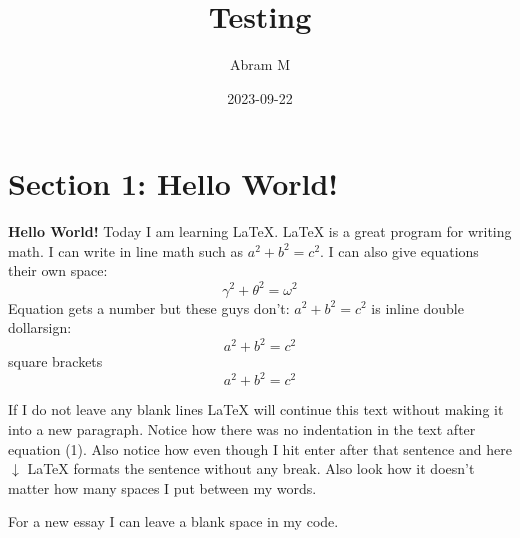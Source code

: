 \documentclass{article} %
\title{Testing} %
\author{Abram M} %
\date{2023-09-22} %
\begin{document}
\maketitle %

\section{Section 1: Hello World!} %

\textbf{Hello World!} Today I am learning \LaTeX. %
\LaTeX{} is a great program for writing math. 
I can write in line math such as $a^2+b^2=c^2$. %
I can also give equations their own space:
\begin{equation} %
  \gamma^2+\theta^2=\omega^2
\end{equation}
Equation gets a number but these guys don't:
$a^2+b^2=c^2$ is inline
double dollarsign:
$$ 
a^2+b^2=c^2
$$ 
square brackets
\[
  a^2+b^2=c^2
\] 

If I do not leave any blank lines \LaTeX{} will continue  this text without making it into a new paragraph.  Notice how there was no indentation in the text after equation (1).
Also notice how even though I hit enter after that sentence and here $\downarrow$
\LaTeX{} formats the sentence without any break.  Also   look  how      it   doesn't     matter          how    many  spaces     I put     between       my    words.

For a new essay I can leave a blank space in my code.
\end{document}
